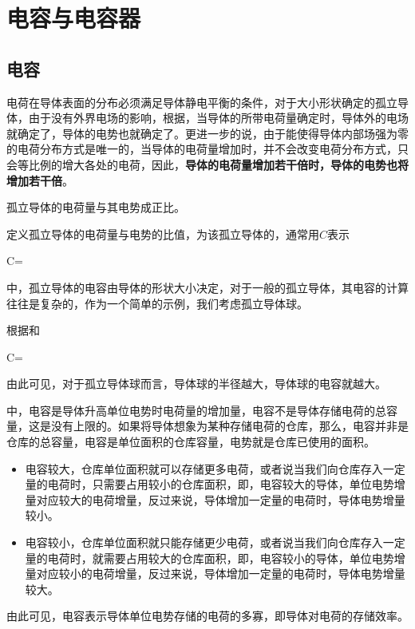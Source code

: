\vspace{20pt}
\section{电容与电容器}

\subsection{电容}
电荷在导体表面的分布必须满足导体静电平衡的条件，对于大小形状确定的孤立导体，由于没有外界电场的影响，根据，当导体的所带电荷量确定时，导体外的电场就确定了，导体的电势也就确定了。更进一步的说，由于能使得导体内部场强为零的电荷分布方式是唯一的，当导体的电荷量增加时，并不会改变电荷分布方式，只会等比例的增大各处的电荷，因此，\textbf{导体的电荷量增加若干倍时，导体的电势也将增加若干倍}。
\begin{BoxPrinciple}[孤立导体的电容特性]
    孤立导体的电荷量与其电势成正比。
\end{BoxPrinciple}
定义孤立导体的电荷量与电势的比值，为该孤立导体的，通常用$C$表示
\begin{BoxDefinition}[孤立导体的电容]
    C=
\end{BoxDefinition}
中，孤立导体的电容由导体的形状大小决定，对于一般的孤立导体，其电容的计算往往是复杂的，作为一个简单的示例，我们考虑孤立导体球。

根据和
\begin{BoxEquation}[孤立导体球的电容]
    C=
\end{BoxEquation}
由此可见，对于孤立导体球而言，导体球的半径越大，导体球的电容就越大。

中，电容是导体升高单位电势时电荷量的增加量，电容不是导体存储电荷的总容量，这是没有上限的。如果将导体想象为某种存储电荷的仓库，那么，电容并非是仓库的总容量，电容是单位面积的仓库容量，电势就是仓库已使用的面积。
\begin{itemize}
    \item 电容较大，仓库单位面积就可以存储更多电荷，或者说当我们向仓库存入一定量的电荷时，只需要占用较小的仓库面积，即，电容较大的导体，单位电势增量对应较大的电荷增量，反过来说，导体增加一定量的电荷时，导体电势增量较小。
    \item 电容较小，仓库单位面积就只能存储更少电荷，或者说当我们向仓库存入一定量的电荷时，就需要占用较大的仓库面积，即，电容较小的导体，单位电势增量对应较小的电荷增量，反过来说，导体增加一定量的电荷时，导体电势增量较大。
\end{itemize}
由此可见，电容表示导体单位电势存储的电荷的多寡，即导体对电荷的存储效率。

